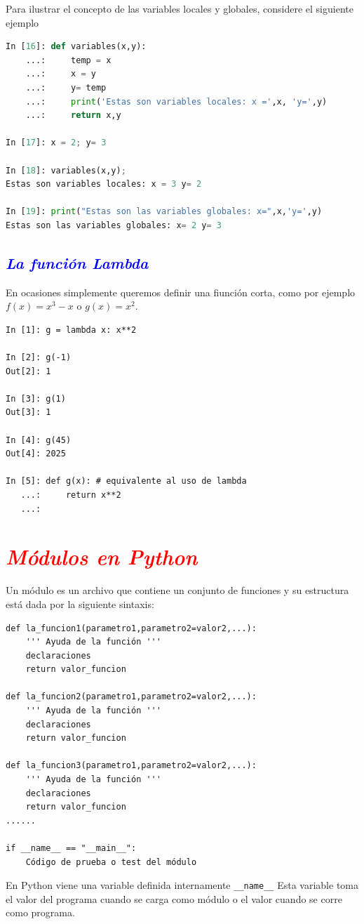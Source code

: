 \documentclass[12pt]{article}
\begin{document}
Para ilustrar el concepto de las variables locales y globales, considere el siguiente ejemplo
\begin{lstlisting}[language=Python]
In [16]: def variables(x,y):
    ...:     temp = x
    ...:     x = y
    ...:     y= temp
    ...:     print('Estas son variables locales: x =',x, 'y=',y)
    ...:     return x,y

In [17]: x = 2; y= 3

In [18]: variables(x,y);
Estas son variables locales: x = 3 y= 2

In [19]: print("Estas son las variables globales: x=",x,'y=',y)
Estas son las variables globales: x= 2 y= 3
\end{lstlisting}
% 

\subsection*{\textcolor{blue}{\textit{La función Lambda}}}
En ocasiones simplemente queremos definir una fiunción corta, como por ejemplo
$f(x) = x^3 - x$ o $g(x)= x^2$.
\begin{lstlisting}
In [1]: g = lambda x: x**2

In [2]: g(-1)
Out[2]: 1

In [3]: g(1)
Out[3]: 1

In [4]: g(45)
Out[4]: 2025

In [5]: def g(x): # equivalente al uso de lambda
   ...:     return x**2
   ...:     
\end{lstlisting}

\section*{\textcolor{red}{\textit{Módulos en Python}}}
Un módulo es un archivo que contiene un conjunto de funciones y su estructura 
	está dada por la siguiente sintaxis:
	\begin{lstlisting}
def la_funcion1(parametro1,parametro2=valor2,...):
	''' Ayuda de la función '''
	declaraciones
	return valor_funcion

def la_funcion2(parametro1,parametro2=valor2,...):
	''' Ayuda de la función '''
	declaraciones
	return valor_funcion

def la_funcion3(parametro1,parametro2=valor2,...):
	''' Ayuda de la función '''
	declaraciones
	return valor_funcion
......

if __name__ == "__main__":
	Código de prueba o test del módulo
	\end{lstlisting}
	En Python viene una variable definida internamente \lstinline|__name__|
	Esta variable toma el valor del programa cuando se carga como módulo o el valor
	cuando se corre como programa. 
    
\end{document}
